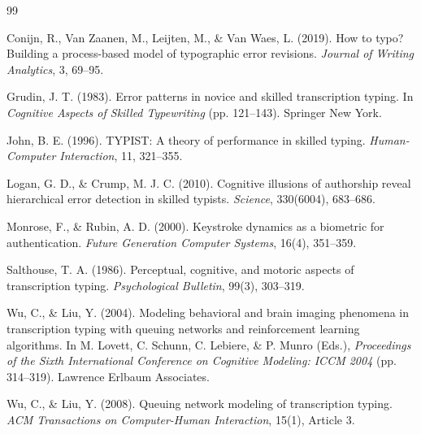 \documentclass[12pt]{article}
\begin{document}
\begin{thebibliography}{99}

Conijn, R., Van Zaanen, M., Leijten, M., \& Van Waes, L. (2019).
How to typo? Building a process-based model of typographic error revisions.
\textit{Journal of Writing Analytics}, 3, 69--95.

Grudin, J. T. (1983).
Error patterns in novice and skilled transcription typing.
In \textit{Cognitive Aspects of Skilled Typewriting} (pp. 121--143). Springer New York.

John, B. E. (1996).
TYPIST: A theory of performance in skilled typing.
\textit{Human-Computer Interaction}, 11, 321--355.

Logan, G. D., \& Crump, M. J. C. (2010).
Cognitive illusions of authorship reveal hierarchical error detection in skilled typists.
\textit{Science}, 330(6004), 683--686.

Monrose, F., \& Rubin, A. D. (2000).
Keystroke dynamics as a biometric for authentication.
\textit{Future Generation Computer Systems}, 16(4), 351--359.

Salthouse, T. A. (1986).
Perceptual, cognitive, and motoric aspects of transcription typing.
\textit{Psychological Bulletin}, 99(3), 303--319.

Wu, C., \& Liu, Y. (2004).
Modeling behavioral and brain imaging phenomena in transcription typing with queuing networks and reinforcement learning algorithms.
In M. Lovett, C. Schunn, C. Lebiere, \& P. Munro (Eds.), \textit{Proceedings of the Sixth International Conference on Cognitive Modeling: ICCM 2004} (pp. 314--319). Lawrence Erlbaum Associates.

Wu, C., \& Liu, Y. (2008).
Queuing network modeling of transcription typing.
\textit{ACM Transactions on Computer-Human Interaction}, 15(1), Article 3.

\end{thebibliography}
\end{document}
